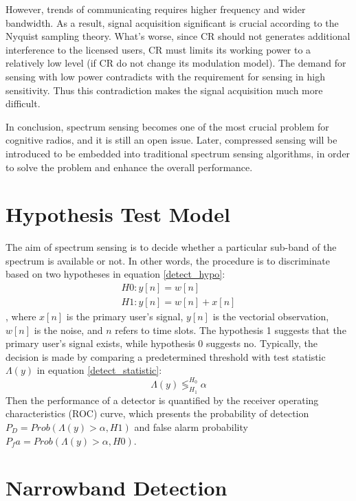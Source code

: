 However, trends of communicating requires higher frequency and wider bandwidth. As a result, signal acquisition significant is crucial according to the Nyquist sampling theory. What's worse, since CR should not generates additional interference to the licensed users, CR must limits its working power to a relatively low level (if CR do not change its modulation model). The demand for sensing with low power contradicts with the requirement for sensing in high sensitivity. Thus this contradiction makes the signal acquisition much more difficult. 

In conclusion, spectrum sensing becomes one of the most crucial problem for cognitive radios, and it is still an open issue. Later, compressed sensing will be introduced to be embedded into traditional spectrum sensing algorithms, in order to solve the problem and enhance the overall performance.

\section{Hypothesis Test Model}
\indent \indent The aim of spectrum sensing is to decide whether a particular sub-band of the spectrum is available or not. In other words, the procedure is to discriminate based on two hypotheses in equation \ref{detect_hypo}: 
\begin{equation}
\label{detect_hypo}
\begin{aligned}
H0: y[n] = w[n]   \\
H1: y[n] = w[n] + x[n] 
\end{aligned}
\end{equation}
, where $x[n]$ is the primary user's signal, $y[n]$ is the vectorial observation, $w[n]$ is the noise, and $n$ refers to time slots. The hypothesis 1 suggests that the primary user's signal exists, while hypothesis 0 suggests no. Typically, the decision is made by comparing a predetermined threshold with test statistic $\Lambda(y)$ in equation \ref{detect_statistic}: 
\begin{equation}
\label{detect_statistic}
\Lambda(y) \mathop{\lessgtr}_{H_1}^{H_0} \alpha
\end{equation}
Then the performance of a detector is quantified by the receiver operating characteristics (ROC) curve, which presents the probability of detection $P_D = Prob(\Lambda(y) > \alpha, H1)$ and false alarm probability $P_fa = Prob(\Lambda(y) > \alpha, H0)$. 



\section{Narrowband Detection}


